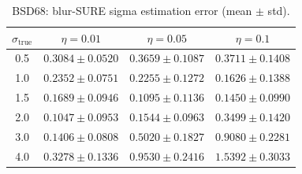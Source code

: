 \begin{table}[h]
\centering
\begin{tabular}{cccc}
\toprule
$\sigma_{\text{true}}$ & $\eta = 0.01$ & $\eta = 0.05$ & $\eta = 0.1$ \\
\midrule
0.5 & $0.3084 \pm 0.0520$ & $0.3659 \pm 0.1087$ & $0.3711 \pm 0.1408$ \\
1.0 & $0.2352 \pm 0.0751$ & $0.2255 \pm 0.1272$ & $0.1626 \pm 0.1388$ \\
1.5 & $0.1689 \pm 0.0946$ & $0.1095 \pm 0.1136$ & $0.1450 \pm 0.0990$ \\
2.0 & $0.1047 \pm 0.0953$ & $0.1544 \pm 0.0963$ & $0.3499 \pm 0.1420$ \\
3.0 & $0.1406 \pm 0.0808$ & $0.5020 \pm 0.1827$ & $0.9080 \pm 0.2281$ \\
4.0 & $0.3278 \pm 0.1336$ & $0.9530 \pm 0.2416$ & $1.5392 \pm 0.3033$ \\
\bottomrule
\end{tabular}
\caption{BSD68: blur-SURE sigma estimation error (mean $\pm$ std).}
\label{tab:sigma_error_bsd68}
\end{table}
